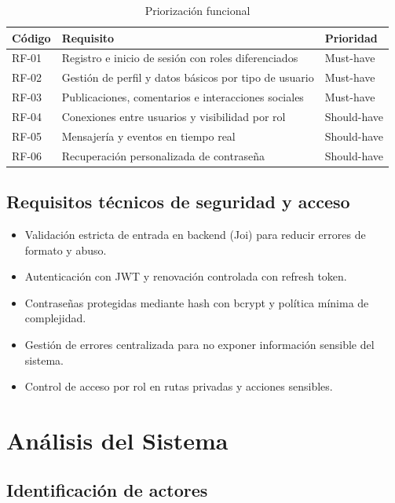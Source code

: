\documentclass[12pt, a4paper]{report}
\begin{document}
\begin{table}[H]
  \centering
  \caption{Priorización funcional}
  \begin{tabularx}{\textwidth}{lXl}
    \toprule
    \textbf{Código} & \textbf{Requisito} & \textbf{Prioridad} \\
    \midrule
    RF-01 & Registro e inicio de sesión con roles diferenciados & Must-have \\
    RF-02 & Gestión de perfil y datos básicos por tipo de usuario & Must-have \\
    RF-03 & Publicaciones, comentarios e interacciones sociales & Must-have \\
    RF-04 & Conexiones entre usuarios y visibilidad por rol & Should-have \\
    RF-05 & Mensajería y eventos en tiempo real & Should-have \\
    RF-06 & Recuperación personalizada de contraseña & Should-have \\
    \bottomrule
  \end{tabularx}
\end{table}

\section{Requisitos técnicos de seguridad y acceso}

\begin{itemize}
  \item Validación estricta de entrada en backend (Joi) para reducir errores de formato y abuso.
  \item Autenticación con JWT y renovación controlada con refresh token.
  \item Contraseñas protegidas mediante hash con bcrypt y política mínima de complejidad.
  \item Gestión de errores centralizada para no exponer información sensible del sistema.
  \item Control de acceso por rol en rutas privadas y acciones sensibles.
\end{itemize}

\chapter{Análisis del Sistema}

\section{Identificación de actores}
\end{document}
